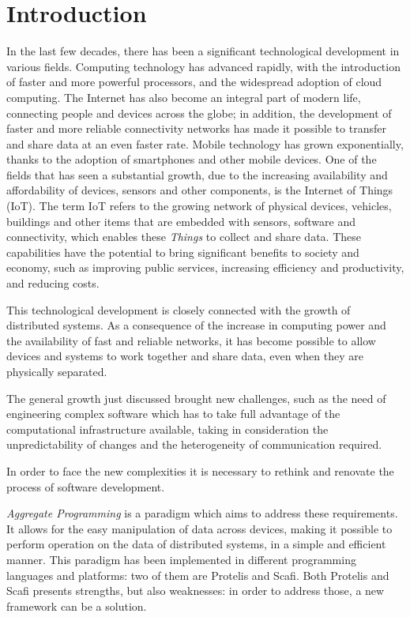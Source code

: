 \chapter{Introduction}\label{introduction}
In the last few decades, there has been a significant technological development in various fields.
Computing technology has advanced rapidly, with the introduction of faster and more powerful processors, and the widespread adoption of cloud computing.\newline
The Internet has also become an integral part of modern life, connecting people and devices across the globe; in addition, the development of faster and more reliable connectivity networks has made it possible to transfer and share data at an even faster rate.\newline
Mobile technology has grown exponentially, thanks to the adoption of smartphones and other mobile devices.\newline
One of the fields that has seen a substantial growth, due to the increasing availability and affordability of devices, sensors and other components, is the Internet of Things (IoT). The term IoT refers to the growing network of physical devices, vehicles, buildings and other items that are embedded with sensors, software and connectivity, which enables these \textit{Things} to collect and share data. These capabilities have the potential to bring significant benefits to society and economy, such as improving public services, increasing efficiency and productivity, and reducing costs.

This technological development is closely connected with the growth of distributed systems. As a consequence of the increase in computing power and the availability of fast and reliable networks, it has become possible to allow devices and systems to work together and share data, even when they are physically separated.

The general growth just discussed brought new challenges, such as the need of engineering complex software which has to take full advantage of the computational infrastructure available, taking in consideration the unpredictability of changes and the heterogeneity of communication required.

In order to face the new complexities it is necessary to rethink and renovate the process of software development.

\textit{Aggregate Programming} is a paradigm which aims to address these requirements. It allows for the easy manipulation of data across devices, making it possible to perform operation on the data of distributed systems, in a simple and efficient manner.\newline
This paradigm has been implemented in different programming languages and platforms: two of them are Protelis and Scafi. 
Both Protelis and Scafi presents strengths, but also weaknesses: in order to address those, a new framework can be a solution.

